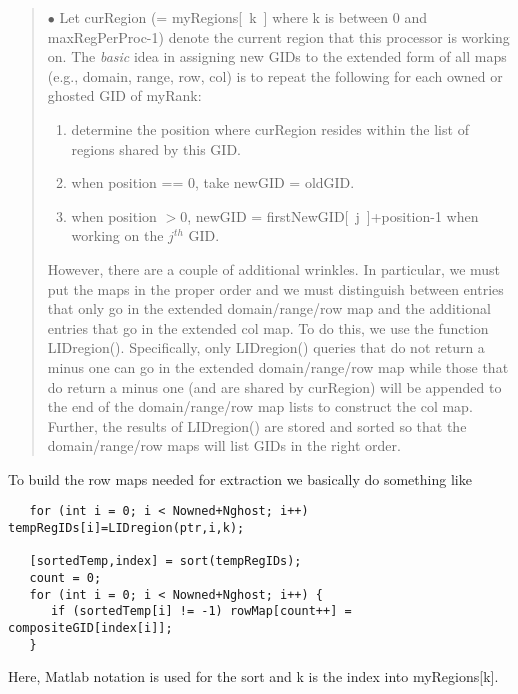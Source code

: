 \documentclass[11pt]{article}
\begin{document}
\begin{quote}
$\bullet$ Let {\sf curRegion} (= {\sf myRegions[~k~]} where k is between 0
and {\sf maxRegPerProc}-1) denote the current region that this processor is
working on. The {\it basic} idea in assigning new GIDs to the extended
form of all maps (e.g., domain, range, row, col) is to
repeat the following for each owned or ghosted GID of
{\sf myRank}:
\begin{enumerate}
\item determine the position where curRegion resides within
      the list of regions shared by this GID.
\item when position == 0, take newGID = oldGID.
\item when position $> 0$,
\newline
       newGID = {\sf firstNewGID[~j~]}+position-1
when working on the $j^{th}$ GID.
\end{enumerate}
However, there are a couple of additional wrinkles. In particular,
we must put the maps in the proper order and we must distinguish
between entries that only go in the extended domain/range/row map and the
additional entries that go in the extended col map. To do this, we use the
function {\sf LIDregion()}. Specifically, only {\sf LIDregion()} queries that
do not return a minus one can go in the extended domain/range/row map
while those that do return a minus one (and are shared by {\sf curRegion})
will be appended to the end of the domain/range/row map lists to construct
the col map. Further, the results of {\sf LIDregion()} are stored and
sorted so that the domain/range/row maps will list GIDs in the right order.
\end{quote}

To build the row maps needed for extraction we basically do something like
\begin{verbatim}
   for (int i = 0; i < Nowned+Nghost; i++) tempRegIDs[i]=LIDregion(ptr,i,k);

   [sortedTemp,index] = sort(tempRegIDs);
   count = 0;
   for (int i = 0; i < Nowned+Nghost; i++) {
      if (sortedTemp[i] != -1) rowMap[count++] = compositeGID[index[i]];
   }
\end{verbatim}
Here, Matlab notation is used for the sort and k is the index into
{\sf myRegions[k]}.
\end{document}
